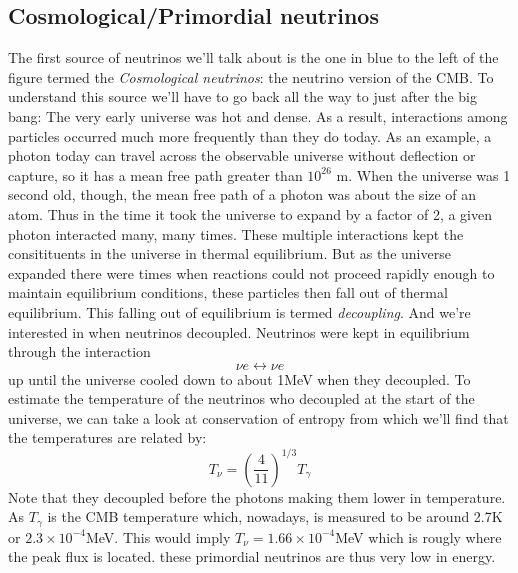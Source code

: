 \documentclass[11pt,a4paper,faculty=we,language=en,doctype=report]{cls/ugent-doc}
\begin{document}
\subsection{Cosmological/Primordial neutrinos}
The first source of neutrinos we'll talk about is the one in blue to the left of the figure
termed the \textit{Cosmological neutrinos}: 
the neutrino version of the CMB.
To understand this source we'll have to go back all the way to just after the big bang:
The very early universe was hot and dense. As a result, interactions among particles
occurred much more frequently than they do today. As an example, a photon today
can travel across the observable universe without deflection or capture, so it has a
mean free path greater than $10^{26}$ m. When the universe was 1 second old, though, 
the mean free path of a photon was about the size of an atom. Thus in
the time it took the universe to expand by a factor of 2, a given photon interacted
many, many times. These multiple interactions kept the consitituents in the universe
in thermal equilibrium. But as the universe expanded there were times when reactions could
not proceed rapidly enough to maintain equilibrium conditions, these particles then fall out
of thermal equilibrium. This falling out of equilibrium is termed \textit{decoupling}.
And we're interested in when neutrinos decoupled.
Neutrinos were kept in equilibrium through the interaction 
\begin{equation}
	\nu e \leftrightarrow \nu e
\end{equation}
up until the universe cooled down to about 1MeV when they decoupled.
To estimate the temperature of the neutrinos who decoupled at the start of the universe, 
we can take a look at conservation of entropy \cite{Dodelson} from which we'll find that
the temperatures are related by:
\begin{equation}
	T_\nu = \left(\frac{4}{11}\right)^{1/3}T_\gamma
\end{equation}
Note that they decoupled before the photons making them lower in temperature.
As $T_\gamma$ is the CMB temperature which, nowadays, is measured to be around
2.7K or $2.3\times10^{-4}$MeV. This would imply $T_\nu = 1.66\times 10^{-4}$MeV which
is rougly where the peak flux is located.  these primordial neutrinos are thus very
low in energy.
\end{document}
